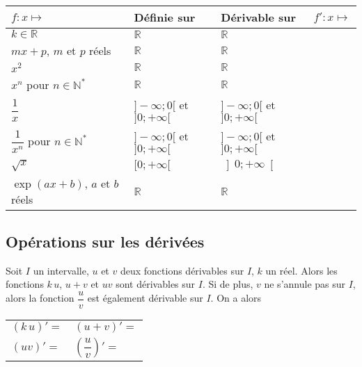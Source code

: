 \documentclass[11pt,fleqn, openany]{book} %
\begin{document}
\renewcommand{\arraystretch}{2}
\begin{center}
\begin{tabularx}{\linewidth}{|X|X|X|X|}
\hline
$f:x\mapsto$ & Définie sur & Dérivable sur & $f':x \mapsto $ \\
\hline
$k\in\mathbb{R}$  & $\mathbb{R}$ & $\mathbb{R}$ & \\
$mx+p$, $m$ et $p$ réels &  $\mathbb{R}$ & $\mathbb{R}$ & \\
$x^2$ &  $\mathbb{R}$ & $\mathbb{R}$ & \\
$x^n$ pour $n\in\mathbb{N}^*$ & $\mathbb{R}$ & $\mathbb{R}$ & \\
$\dfrac{1}{x}$ & $]-\infty;0[$ et $]0;+\infty[$ & $]-\infty;0[$ et $]0;+\infty[$ & \\
$\dfrac{1}{x^n}$ pour $n\in\mathbb{N}^*$ & $]-\infty;0[$ et $]0;+\infty[$& $]-\infty;0[$ et $]0;+\infty[$ &\\
$\sqrt{x}$ & $[0;+\infty[$ & $\left]0;+\infty \right[$ & \\
$\exp (ax+b)$, $a$ et $b$ réels & $\mathbb{R}$ & $\mathbb{R}$ & \\
\hline\end{tabularx}
\end{center}

\subsection{Opérations sur les dérivées}

\begin{theorem}Soit $I$ un intervalle, $u$ et $v$ deux fonctions dérivables sur $I$, $k$ un réel. Alors les fonctions $k\,u$, $u+v$ et $uv$ sont dérivables sur $I$. Si de plus, $v$ ne s'annule pas sur $I$, alors la fonction $\dfrac{u}{v}$ est également dérivable sur $I$. On a alors
\begin{center}
\begin{tabularx}{0.6\linewidth}{XX}
$(k\,u)' = $ & $(u+v)'=$ \\
$(uv)'=$ & $\left(\dfrac{u}{v}\right)' = $

\end{tabularx}
\end{center}
\vspace{-0.5cm}
\end{theorem}
\end{document}
